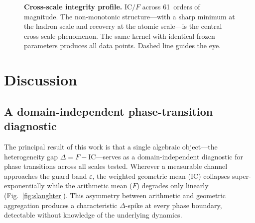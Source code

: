 \documentclass[
  aps,
  prx,
  twocolumn,
  superscriptaddress,
  nofootinbib,
  floatfix
]{revtex4-2}
\newcommand{\eps}{\varepsilon}
\newcommand{\IC}{\mathrm{IC}}
\begin{document}
\begin{figure}[!tb]
\centering
{}
\caption{\textbf{Cross-scale integrity profile.} $\IC/F$ across
61~orders of magnitude. The non-monotonic structure---with a sharp
minimum at the hadron scale and recovery at the atomic scale---is the
central cross-scale phenomenon. The same kernel with identical frozen
parameters produces all data points. Dashed line guides the eye.}
\label{fig:crossscale}
\end{figure}

\clearpage
\section{Discussion}

\subsection{A domain-independent phase-transition diagnostic}

The principal result of this work is that a single algebraic
object---the heterogeneity gap $\Delta = F - \IC$---serves as a
domain-independent diagnostic for phase transitions across all scales
tested. Wherever a measurable channel approaches the guard band
$\eps$, the weighted geometric mean ($\IC$) collapses
super-exponentially while the arithmetic mean ($F$) degrades only
linearly (Fig.~\ref{fig:slaughter}). This asymmetry between
arithmetic and geometric aggregation produces a characteristic
$\Delta$-spike at every phase boundary, detectable without knowledge
of the underlying dynamics.
\end{document}

